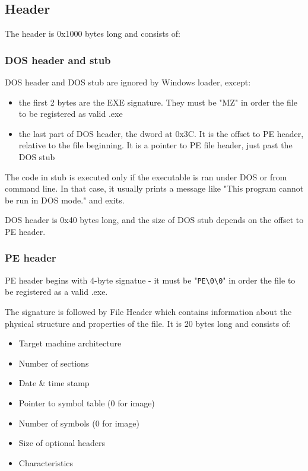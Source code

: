 \documentclass[a4paper,12pt]{article}
\begin{document}
\subsection{Header}
The header is 0x1000 bytes long and consists of:

\subsubsection{DOS header and stub}
DOS header and DOS stub are ignored by Windows loader, except:

\begin{itemize}
\item the first 2 bytes are the EXE signature. They must be "MZ" in order
    the file to be registered as valid .exe
\item the last part of DOS header, the dword at 0x3C. It is the offset to
    PE header, relative to the file beginning. It is a pointer to PE file
    header, just past the DOS stub
\end{itemize}

The code in stub is executed only if the executable is ran under DOS or from
command line. In that case, it usually prints a message like "This program
cannot be run in DOS mode." and exits.

DOS header is 0x40 bytes long, and the size of DOS stub depends on the offset
to PE header.

\subsubsection{PE header}
PE header begins with 4-byte signatue - it must be
"\texttt{PE\textbackslash0\textbackslash0}" in order the file to be registered
as a valid .exe.

The signature is followed by File Header which contains information about the
physical structure and properties of the file. It is 20 bytes long and
consists of:

\begin{itemize}
\item Target machine architecture
\item Number of sections
\item Date \& time stamp
\item Pointer to symbol table (0 for image)
\item Number of symbols (0 for image)
\item Size of optional headers
\item Characteristics
\end{itemize}
\end{document}
